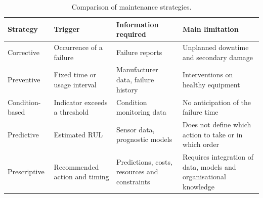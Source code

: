 \begin{table}[!htbp]
\centering
\caption{Comparison of maintenance strategies.}
\label{tab:strategies}
\scriptsize
\begin{tabular}{|>{\raggedright\arraybackslash}p{1.7cm}|>{\raggedright\arraybackslash}p{2.6cm}|>{\raggedright\arraybackslash}p{2.8cm}|>{\raggedright\arraybackslash}p{3.3cm}|}
\hline
\textbf{Strategy} & \textbf{Trigger} & \textbf{Information required} & \textbf{Main limitation} \\
\hline
Corrective & Occurrence of a failure & Failure reports & Unplanned downtime and secondary damage \\
\hline
Preventive & Fixed time or usage interval & Manufacturer data, failure history & Interventions on healthy equipment \\
\hline
Condition-based & Indicator exceeds a threshold & Condition monitoring data & No anticipation of the failure time \\
\hline
Predictive & Estimated RUL & Sensor data, prognostic models & Does not define which action to take or in which order \\
\hline
Prescriptive & Recommended action and timing & Predictions, costs, resources and constraints & Requires integration of data, models and organisational knowledge \\
\hline
\end{tabular}
\end{table}

